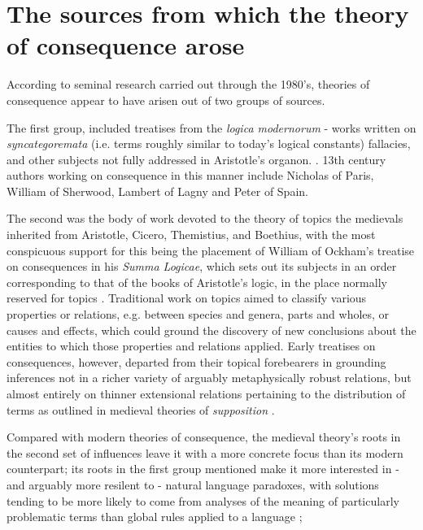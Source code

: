 \documentclass[]{article}
\begin{document}
\section{The sources from which the theory of consequence arose}
According to seminal research carried out through the 1980's,
theories of consequence appear to have arisen out of two groups of sources. 

The first group, 
included treatises 
from the \emph{logica modernorum} 
- 
works written on 
\emph{syncategoremata} (i.e. terms roughly similar to today's logical constants) 
fallacies,
and other subjects not fully addressed in Aristotle's organon. 
\autocite{Green-Pedersen1984,Spruyt2018}.
13th century authors working on consequence in this manner include 
Nicholas of Paris, 
William of Sherwood, 
Lambert of Lagny 
and Peter of Spain.

The second was the body of work devoted to the theory of topics the medievals inherited from Aristotle, 
Cicero, 
Themistius, 
and Boethius, 
with the most conspicuous support for this being the placement of William of Ockham's treatise on consequences in his \emph{Summa Logicae}, 
which sets out its subjects in an order corresponding to that of the books of Aristotle's logic, 
in the place normally reserved for topics \autocite{Stump1982,OckhamSL}. 
Traditional work on topics aimed to classify various properties or relations, 
e.g. between species and genera, 
parts and wholes, 
or causes and effects, 
which could ground the discovery of new conclusions about the entities to which those properties and relations applied. 
Early treatises on consequences, 
however, 
departed from their topical forebearers in 
grounding inferences not in a richer variety of arguably metaphysically robust relations, but almost entirely on thinner extensional relations pertaining to the distribution of terms as outlined in medieval theories of \emph{supposition} \autocite{HodgesBurley,sep-medieval-terms,Archambault2022}. 

Compared with modern theories of consequence, 
the medieval theory's roots 
in the second set of influences leave it with a more concrete focus than its modern counterpart;
its roots 
in the first group mentioned 
make it more interested in 
- and arguably more resilent to - 
natural language paradoxes, 
with solutions tending to be more likely to come from analyses of the meaning of particularly problematic terms than global rules applied to a language \autocite{Klima2004,Klima2016}; 
\end{document}
